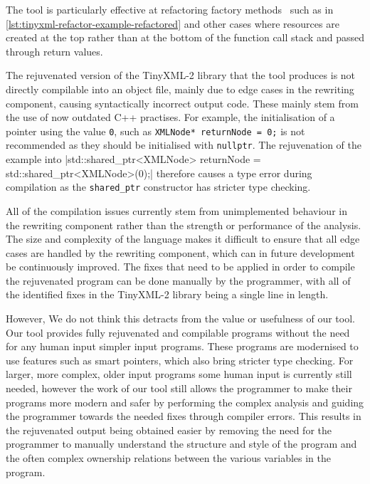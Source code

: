\documentclass{mpaper}
\begin{document}
    The tool is particularly effective at refactoring factory methods~\cite{Gamma1995} such as in \autoref{lst:tinyxml-refactor-example-refactored} and other cases where resources are created at the top rather than at the bottom of the function call stack and passed through return values.
    
    The rejuvenated version of the TinyXML-2 library that the tool produces is not directly compilable into an object file, mainly due to edge cases in the rewriting component, causing syntactically incorrect output code.
    These mainly stem from the use of now outdated C++ practises.
    For example, the initialisation of a pointer using the value \texttt{0}, such as
    \texttt{XMLNode* returnNode = 0;} is not recommended as they should be initialised with \texttt{nullptr}.
    The rejuvenation of the example into
    |std::shared_ptr<XMLNode>  returnNode = std::shared_ptr<XMLNode>(0);|
    therefore causes a type error during compilation as the \texttt{shared_ptr} constructor has stricter type checking. 
    
    All of the compilation issues currently stem from unimplemented behaviour in the rewriting component rather than the strength or performance of the analysis.
    The size and complexity of the language makes it difficult to ensure that all edge cases are handled by the rewriting component, which can in future development be continuously improved.
    The fixes that need to be applied in order to compile the rejuvenated program can be done manually by the programmer, with all of the identified fixes in the TinyXML-2 library being a single line in length. 
    
    However, We do not think this detracts from the value or usefulness of our tool.
    Our tool provides fully rejuvenated and compilable programs without the need for any human input simpler input programs. 
    These programs are modernised to use features such as smart pointers, which also bring stricter type checking.
    For larger, more complex, older input programs some human input is currently still needed, however the work of our tool still allows the programmer to make their programs more modern and safer by performing the complex analysis and guiding the programmer towards the needed fixes through compiler errors.
    This results in the rejuvenated output being obtained easier by removing the need for the programmer to manually understand the structure and style of the program and the often complex ownership relations between the various variables in the program. 
    
\end{document}
